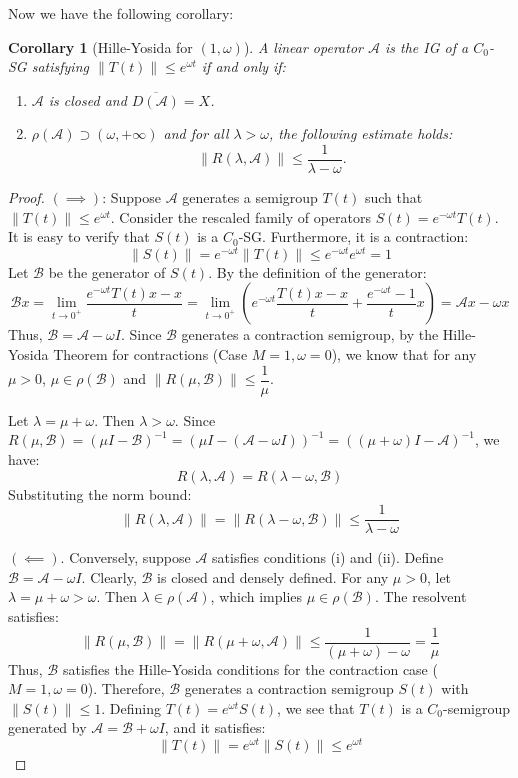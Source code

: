 \documentclass[12pt, oneside]{book}
\newtheorem{coro}{Corollary}[section]
\newcommand{\norm}[1]{\left\lVert#1\right\rVert}
\newcommand{\A}{\mathscr{A}}
\newcommand{\B}{\mathscr{B}}
\begin{document}
Now we have the following corollary:

\begin{coro}[Hille-Yosida for $(1, \omega)$]
A linear operator $\A$ is the IG of a $C_0$-SG satisfying $\norm{T(t)} \le e^{\omega t}$ if and only if:
\begin{enumerate}[label=(\roman*)]
    \item $\A$ is closed and $\overline{D(\A)} = X$.
    \item $\rho(\A) \supset (\omega, +\infty)$ and for all $\lambda > \omega$, the following estimate holds:
    $$
    \norm{R(\lambda, \A)} \le \frac{1}{\lambda - \omega}.
    $$
\end{enumerate}
\end{coro}

\begin{proof}
\noindent $(\implies)$:
Suppose $\A$ generates a semigroup $T(t)$ such that $\norm{T(t)} \le e^{\omega t}$. Consider the rescaled family of operators $S(t) = e^{-\omega t} T(t)$. It is easy to verify that $S(t)$ is a $C_0$-SG. Furthermore, it is a contraction:
$$
\norm{S(t)} = e^{-\omega t} \norm{T(t)} \le e^{-\omega t} e^{\omega t} = 1
$$
Let $\B$ be the generator of $S(t)$. By the definition of the generator:
$$
\B x = \lim_{t \to 0^+} \frac{e^{-\omega t} T(t)x - x}{t} = \lim_{t \to 0^+} \left( e^{-\omega t} \frac{T(t)x - x}{t} + \frac{e^{-\omega t} - 1}{t} x \right) = \A x - \omega x
$$
Thus, $\B = \A - \omega I$.
Since $\B$ generates a contraction semigroup, by the Hille-Yosida Theorem for contractions (Case $M=1, \omega=0$), we know that for any $\mu > 0$, $\mu \in \rho(\B)$ and $\norm{R(\mu, \B)} \le \dfrac{1}{\mu}$.

Let $\lambda = \mu + \omega$. Then $\lambda > \omega$. Since $R(\mu, \mathscr{B}) = (\mu I - \mathscr{B})^{-1} = (\mu I - (\A - \omega I))^{-1} = ((\mu + \omega)I - \A)^{-1}$, we have:
$$
	R(\lambda, \A) = R(\lambda - \omega, \mathscr{B})
$$
Substituting the norm bound:
$$
	\norm{R(\lambda, \A)} = \norm{R(\lambda - \omega, \mathscr{B})} \le \frac{1}{\lambda - \omega}
$$

\noindent $(\impliedby)$.
Conversely, suppose $\A$ satisfies conditions (i) and (ii). Define $\B = \A - \omega I$.
Clearly, $\B$ is closed and densely defined.
For any $\mu > 0$, let $\lambda = \mu + \omega > \omega$. Then $\lambda \in \rho(\A)$, which implies $\mu \in \rho(\mathscr{B})$.
The resolvent satisfies:
$$
	\norm{R(\mu, \B)} = \norm{R(\mu + \omega, \A)} \le \frac{1}{(\mu + \omega) - \omega} = \frac{1}{\mu}
$$
Thus, $\B$ satisfies the Hille-Yosida conditions for the contraction case ($M=1, \omega=0$). Therefore, $\B$ generates a contraction semigroup $S(t)$ with $\norm{S(t)} \le 1$.
Defining $T(t) = e^{\omega t} S(t)$, we see that $T(t)$ is a $C_0$-semigroup generated by $\A = \B + \omega I$, and it satisfies:
$$
\norm{T(t)} = e^{\omega t} \norm{S(t)} \le e^{\omega t}
$$
\end{proof}
\end{document}

